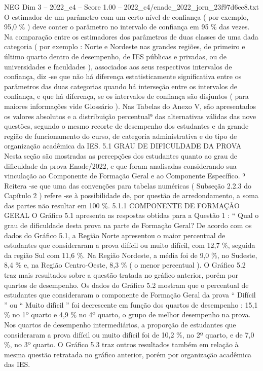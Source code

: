 \begin{textsample}{NEG Dim 3 – 2022\_c4 – Score 1.00 – 2022\_c4/enade\_2022\_jorn\_23f97d6ee8.txt}
O estimador de um parâmetro com um certo nível de confiança ( por exemplo, 95,0 \% ) deve conter o parâmetro no intervalo de confiança em 95 \% das vezes.
Na comparação entre os estimadores dos parâmetros de duas classes de uma dada categoria ( por exemplo : Norte e Nordeste nas grandes regiões, de primeiro e último quarto dentro de desempenho, de IES públicas e privadas, ou de universidades e faculdades ), associados aos seus respectivos intervalos de confiança, diz -se que não há diferença estatisticamente significativa entre os parâmetros das duas categorias quando há interseção entre os intervalos de confiança, e que há diferença, se os intervalos de confiança são disjuntos ( para maiores informações vide Glossário ).
Nas Tabelas do Anexo V, são apresentados os valores absolutos e a distribuição percentual⁹ das alternativas válidas das nove questões, segundo o mesmo recorte de desempenho dos estudantes e da grande região de funcionamento do curso, de categoria administrativa e do tipo de organização acadêmica da IES. 5.1 GRAU DE DIFICULDADE DA PROVA Nesta seção são mostradas as percepções dos estudantes quanto ao grau de dificuldade da prova Enade/2022, e que foram analisadas considerando sua vinculação ao Componente de Formação Geral e ao Componente Específico. ⁹ Reitera -se que uma das convenções para tabelas numéricas ( Subseção 2.2.3 do Capítulo 2 ) refere -se à possibilidade de, por questão de arredondamento, a soma das partes não resultar em 100 \%. 5.1.1 COMPONENTE DE FORMAÇÃO GERAL O Gráfico 5.1 apresenta as respostas obtidas para a Questão 1 : “ Qual o grau de dificuldade desta prova na parte de Formação Geral?
De acordo com os dados do Gráfico 5.1, a Região Norte apresentou o maior percentual de estudantes que consideraram a prova difícil ou muito difícil, com 12,7 \%, seguida da região Sul com 11,6 \%.
Na Região Nordeste, a média foi de 9,0 \%, no Sudeste, 8,4 \% e, na Região Centro-Oeste, 8,3 \% ( o menor percentual ).
O Gráfico 5.2 traz mais resultados sobre a questão tratada no gráfico anterior, porém por quartos de desempenho.
Os dados do Gráfico 5.2 mostram que o percentual de estudantes que consideraram o componente de Formação Geral da prova “ Difícil ” ou “ Muito difícil ” foi decrescente em função dos quartos de desempenho : 15,1 \% no 1º quarto e 4,9 \% no 4º quarto, o grupo de melhor desempenho na prova.
Nos quartos de desempenho intermediários, a proporção de estudantes que consideraram a prova difícil ou muito difícil foi de 10,2 \%, no 2º quarto, e de 7,0 \%, no 3º quarto.
O Gráfico 5.3 traz outros resultados também em relação à mesma questão retratada no gráfico anterior, porém por organização acadêmica das IES.

\end{textsample}
